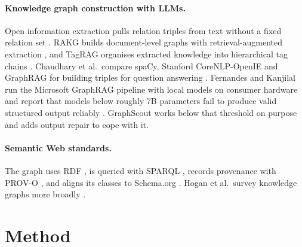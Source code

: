 \documentclass[11pt]{article}
\begin{document}
\paragraph{Knowledge graph construction with LLMs.} Open information extraction pulls relation triples from text without a fixed relation set \cite{banko2007openie}. RAKG builds document-level graphs with retrieval-augmented extraction \cite{zhang2025rakg}, and TagRAG organises extracted knowledge into hierarchical tag chains \cite{tao2025tagrag}. Chaudhary et al.\ compare spaCy, Stanford CoreNLP-OpenIE and GraphRAG for building triples for question answering \cite{chaudhary2025fusing}. Fernandes and Kanjilal run the Microsoft GraphRAG pipeline with local models on consumer hardware and report that models below roughly 7B parameters fail to produce valid structured output reliably \cite{fernandes2026consumer}. GraphScout works below that threshold on purpose and adds output repair to cope with it.

\paragraph{Semantic Web standards.} The graph uses RDF \cite{w3c2014rdf}, is queried with SPARQL \cite{w3c2013sparql}, records provenance with PROV-O \cite{w3c2013prov}, and aligns its classes to Schema.org \cite{guha2016schemaorg}. Hogan et al.\ survey knowledge graphs more broadly \cite{hogan2021kg}.

\section{Method}
\end{document}
